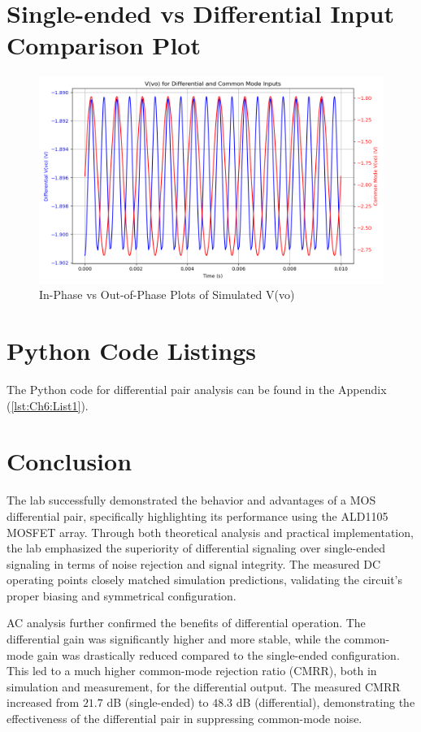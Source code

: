 \section{Single-ended vs Differential Input Comparison Plot}
\vspace*{2cm}
\begin{figure}[H]
    \centering
    \includegraphics[width=0.95\linewidth]{Chapter_6/Lab-06-LTSpice-Plot.png}
    \caption{In-Phase vs Out-of-Phase Plots of Simulated V(vo)}
    \label{Ch6_fig:4}
\end{figure}

\section{Python Code Listings}

The Python code for differential pair analysis can be found in the Appendix (\cref{lst:Ch6:List1}).

\section{Conclusion}
The lab successfully demonstrated the behavior and advantages of a MOS differential pair, specifically highlighting its performance using the ALD1105 MOSFET array. Through both theoretical analysis and practical implementation, the lab emphasized the superiority of differential signaling over single-ended signaling in terms of noise rejection and signal integrity. The measured DC operating points closely matched simulation predictions, validating the circuit’s proper biasing and symmetrical configuration.

AC analysis further confirmed the benefits of differential operation. The differential gain was significantly higher and more stable, while the common-mode gain was drastically reduced compared to the single-ended configuration. This led to a much higher common-mode rejection ratio (CMRR), both in simulation and measurement, for the differential output. The measured CMRR increased from $21.7$ dB (single-ended) to $48.3$ dB (differential), demonstrating the effectiveness of the differential pair in suppressing common-mode noise.

